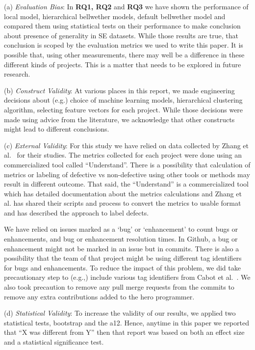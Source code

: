 \documentclass[10pt,journal,compsoc]{IEEEtran}
\begin{document}
(a) \textit{Evaluation Bias}: 
In  {\bf  RQ1, RQ2} and {\bf RQ3} we have shown the performance of local model, hierarchical bellwether models, default bellwether model and compared them using statistical tests on their performance to make conclusion about presence of generality in SE datasets. While those results are true, that conclusion is scoped by the evaluation metrics we used to write this paper. It is possible that, using other measurements, there may well be a difference in these different kinds of projects. This is a matter that needs to be explored in future research.  

    
(b) \textit{Construct Validity}: At various places in this report, we made engineering decisions about (e.g.) choice of machine learning models, hierarchical clustering algorithm, selecting feature vectors for each project. While those decisions were made using advice from the literature, we acknowledge that other constructs might lead to different conclusions. 

(c) \textit{External Validity}: For this study we have relied on data collected by Zhang et al.~\cite{zhang15} for their studies. The metrics collected for each project were done using an commercialized tool called ``Understand''. There is a possibility that calculation of metrics or labeling of defective vs non-defective using other tools or methods may result in different outcome. That said, the ``Understand'' is a commercialized tool which has detailed documentation about the metrics calculations and Zhang et al. has shared their scripts and process to convert the metrics to usable format and has described the approach to label defects.  

We have relied on issues marked as a `bug' or `enhancement' to count bugs or enhancements, and bug or enhancement resolution times. In Github, a bug or enhancement might not be marked in an issue but in commits. There is also a possibility that the team of that project might be using different tag identifiers for bugs and enhancements. To reduce the impact of this problem, we  did take precautionary step to (e.g.,) include various tag identifiers from Cabot et al.~\cite{cabot2015exploring}. We also took precaution to remove any pull merge requests from the commits to remove any extra contributions added to the hero programmer. 

(d) \textit{Statistical Validity}: To increase the validity of our results, we applied two statistical tests, bootstrap and the a12. Hence, anytime in this paper we reported that ``X was different from Y'' then that report was based on both an effect size and a statistical significance test.
 
\end{document}
